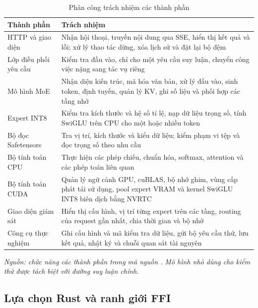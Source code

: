 \begin{table}[htbp]
\centering
\setlength{\tabcolsep}{6pt}
\small
\caption{Phân công trách nhiệm các thành phần}
\label{tab:bang_3_1}
\begin{tabularx}{\textwidth}{>{\RaggedRight\arraybackslash}p{4.5cm} >{\RaggedRight\arraybackslash}X}
\toprule
\rowcolor{tableheader}
\textbf{Thành phần} & \textbf{Trách nhiệm} \\
\midrule
HTTP và giao diện & Nhận hội thoại, truyền nội dung qua SSE, hiển thị kết quả và lỗi; xử lý thao tác dừng, xóa lịch sử và đặt lại bộ đệm \\
Lớp điều phối yêu cầu & Kiểm tra đầu vào, chỉ cho một yêu cầu suy luận, chuyển công việc nặng sang tác vụ riêng \\
Mô hình MoE & Nhận diện kiến trúc, mã hóa văn bản, xử lý đầu vào, sinh token, định tuyến, quản lý KV, ghi số liệu và phối hợp các tầng nhớ \\
Expert INT8 & Kiểm tra kích thước và hệ số tỉ lệ, nạp dữ liệu trọng số, tính SwiGLU trên CPU cho một hoặc nhiều token \\
Bộ đọc Safetensors & Tra vị trí, kích thước và kiểu dữ liệu; kiểm phạm vi tệp và đọc trọng số theo nhu cầu \\
Bộ tính toán CPU & Thực hiện các phép chiếu, chuẩn hóa, softmax, attention và các phép toán liên quan \\
Bộ tính toán CUDA & Quản lý ngữ cảnh GPU, cuBLAS, bộ nhớ ghim, vùng cấp phát tái sử dụng, pool expert VRAM và kernel SwiGLU INT8 biên dịch bằng NVRTC \\
Giao diện giám sát & Hiển thị cấu hình, vị trí từng expert trên các tầng, routing của request gần nhất, chia thời gian và bộ nhớ \\
Công cụ thực nghiệm & Ghi cấu hình và mã kiểm tra dữ liệu, gửi bộ yêu cầu thử, lưu kết quả, nhật ký và chuỗi quan sát tài nguyên \\
\bottomrule
\end{tabularx}
\vspace{3pt}\par\noindent\footnotesize\textit{Nguồn: chức năng các thành phần trong mã nguồn \cite{moe_tierengine_arch}. Mô hình nhỏ dùng cho kiểm thử được tách biệt với đường suy luận chính.}
\end{table}

\subsection{Lựa chọn Rust và ranh giới FFI}

